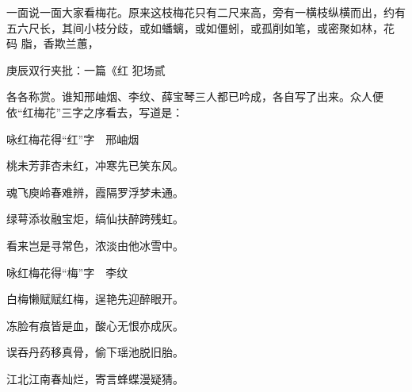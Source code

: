 \begin{parag}
    一面说一面大家看梅花。原来这枝梅花只有二尺来高，旁有一横枝纵横而出，约有五六尺长，其间小枝分歧，或如蟠螭，或如僵蚓，或孤削如笔，或密聚如林，花 码 脂，香欺兰蕙，\begin{note}庚辰双行夹批：一篇《红 犯场贰\end{note}各各称赏。谁知邢岫烟、李纹、薛宝琴三人都已吟成，各自写了出来。众人便依“红梅花”三字之序看去，写道是：
\end{parag}


\begin{poem}

    \begin{pl}

        咏红梅花得“红”字　邢岫烟
    \end{pl}
    \begin{pl}

        桃未芳菲杏未红，冲寒先已笑东风。
    \end{pl}
    \begin{pl}

        魂飞庾岭春难辨，霞隔罗浮梦未通。
    \end{pl}
    \begin{pl}

        绿萼添妆融宝炬，缟仙扶醉跨残虹。
    \end{pl}
    \begin{pl}

        看来岂是寻常色，浓淡由他冰雪中。
    \end{pl}

    \emptypl

    \begin{pl}
        咏红梅花得“梅”字　李纹
    \end{pl}
    \begin{pl}

        白梅懒赋赋红梅，逞艳先迎醉眼开。
    \end{pl}
    \begin{pl}

        冻脸有痕皆是血，酸心无恨亦成灰。
    \end{pl}
    \begin{pl}

        误吞丹药移真骨，偷下瑶池脱旧胎。
    \end{pl}
    \begin{pl}

        江北江南春灿烂，寄言蜂蝶漫疑猜。
    \end{pl}


\end{poem}
